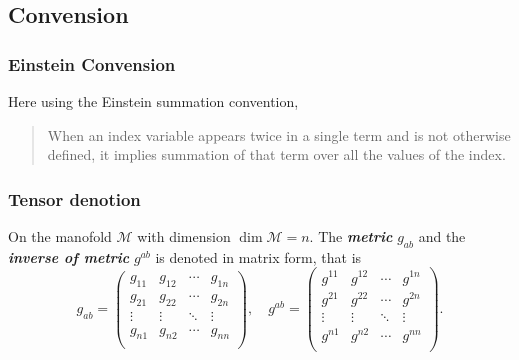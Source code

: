 \documentclass[11pt]{article}
\begin{document}
        
    \hypertarget{convension}{%
\subsection{Convension}\label{convension}}

\hypertarget{einstein-convension}{%
\subsubsection{Einstein Convension}\label{einstein-convension}}

Here using the Einstein summation convention, 
\begin{quote}
When an index variable appears twice in a single term and is not otherwise
defined, it implies summation of that term over all the
values of the index.
\end{quote}

\hypertarget{tensor-denotion}{%
\subsubsection{Tensor denotion}\label{tensor-denotion}}

On the manofold \(\mathcal{M}\) with dimension \(\dim\mathcal{M} = n\).
The \textbf{\emph{metric}} \(g_{ab}\) and the \textbf{\emph{inverse of
metric}} \(g^{ab}\) is denoted in matrix form, that is \[
g_{ab} = \begin{pmatrix}
 g_{11} &  g_{12} & \cdots &  g_{1n} \\ 
 g_{21} &  g_{22} & \cdots &  g_{2n} \\ 
 \vdots & \vdots & \ddots &\vdots \\ 
 g_{n1} &  g_{n2} & \cdots &  g_{nn} \\ 
\end{pmatrix}
,\quad 
g^{ab} = \begin{pmatrix}
 g^{11} &  g^{12} & \cdots &  g^{1n} \\ 
 g^{21} &  g^{22} & \cdots &  g^{2n} \\ 
 \vdots & \vdots & \ddots &\vdots \\ 
 g^{n1} &  g^{n2} & \cdots &  g^{nn} \\ 
\end{pmatrix}.
\]
\end{document}

